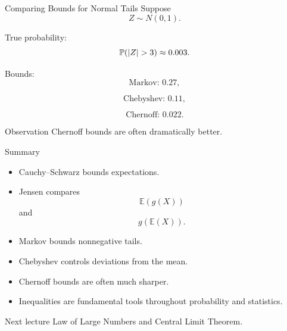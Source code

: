 \begin{frame}{Comparing Bounds for Normal Tails}
Suppose
\[
Z\sim N(0,1).
\]

True probability:
\[
\Prob(|Z|>3)\approx0.003.
\]

Bounds:
\[
\text{Markov: }0.27,
\]

\[
\text{Chebyshev: }0.11,
\]

\[
\text{Chernoff: }0.022.
\]

\vspace{0.25cm}

\begin{keybox}{Observation}
Chernoff bounds are often dramatically better.
\end{keybox}
\end{frame}

\begin{frame}{Summary}
\begin{itemize}
    \item Cauchy--Schwarz bounds expectations.

    \item Jensen compares
    \[
    \mathbb{E}(g(X))
    \]
    and
    \[
    g(\mathbb{E}(X)).
    \]

    \item Markov bounds nonnegative tails.

    \item Chebyshev controls deviations from the mean.

    \item Chernoff bounds are often much sharper.

    \item Inequalities are fundamental tools throughout probability and statistics.
\end{itemize}

\vspace{0.25cm}

\begin{keybox}{Next lecture}
Law of Large Numbers and Central Limit Theorem.
\end{keybox}
\end{frame}
